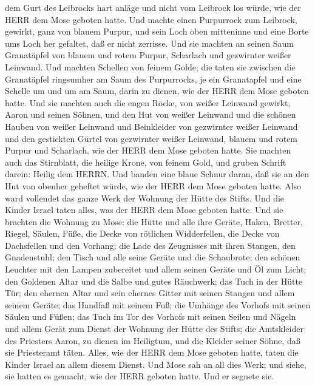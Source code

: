 dem Gurt des Leibrocks hart anläge und nicht vom Leibrock los würde, wie
der HERR dem Mose geboten hatte.  Und machte einen
Purpurrock zum Leibrock, gewirkt, ganz von blauem Purpur, 
und sein Loch oben mitteninne und eine Borte ums Loch her gefaltet, daß
er nicht zerrisse.  Und sie machten an seinen Saum
Granatäpfel von blauem und rotem Purpur, Scharlach und gezwirnter weißer
Leinwand.  Und machten Schellen von feinem Golde; die taten
sie zwischen die Granatäpfel ringsumher am Saum des Purpurrocks,
 je ein Granatapfel und eine Schelle um und um am Saum,
darin zu dienen, wie der HERR dem Mose geboten hatte.  Und
sie machten auch die engen Röcke, von weißer Leinwand gewirkt, Aaron und
seinen Söhnen,  und den Hut von weißer Leinwand und die
schönen Hauben von weißer Leinwand und Beinkleider von gezwirnter weißer
Leinwand  und den gestickten Gürtel von gezwirnter weißer
Leinwand, blauem und rotem Purpur und Scharlach, wie der HERR dem Mose
geboten hatte.  Sie machten auch das Stirnblatt, die
heilige Krone, von feinem Gold, und gruben Schrift darein: Heilig dem
HERRN.  Und banden eine blaue Schnur daran, daß sie an den
Hut von obenher geheftet würde, wie der HERR dem Mose geboten hatte.
 Also ward vollendet das ganze Werk der Wohnung der Hütte
des Stifts. Und die Kinder Israel taten alles, was der HERR dem Mose
geboten hatte.  Und sie brachten die Wohnung zu Mose: die
Hütte und alle ihre Geräte, Haken, Bretter, Riegel, Säulen, Füße,
 die Decke von rötlichen Widderfellen, die Decke von
Dachsfellen und den Vorhang;  die Lade des Zeugnisses mit
ihren Stangen, den Gnadenstuhl;  den Tisch und alle seine
Geräte und die Schaubrote;  den schönen Leuchter mit den
Lampen zubereitet und allem seinen Geräte und Öl zum Licht;
 den Goldenen Altar und die Salbe und gutes Räuchwerk; das
Tuch in der Hütte Tür;  den ehernen Altar und sein ehernes
Gitter mit seinen Stangen und allem seinem Geräte; das Handfaß mit
seinem Fuß;  die Umhänge des Vorhofs mit seinen Säulen und
Füßen; das Tuch im Tor des Vorhofs mit seinen Seilen und Nägeln und
allem Gerät zum Dienst der Wohnung der Hütte des Stifts; 
die Amtskleider des Priesters Aaron, zu dienen im Heiligtum, und die
Kleider seiner Söhne, daß sie Priesteramt täten.  Alles,
wie der HERR dem Mose geboten hatte, taten die Kinder Israel an allem
diesem Dienst.  Und Mose sah an all dies Werk; und siehe,
sie hatten es gemacht, wie der HERR geboten hatte. Und er segnete sie.

